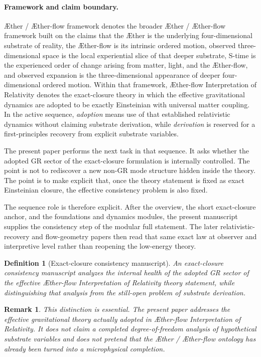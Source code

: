 \documentclass[11pt]{article}
\newcommand{\Aether}{\AE{}ther}
\newcommand{\Aflow}{\AE{}ther-flow}
\newcommand{\TheoryName}{\Aflow{} Interpretation of Relativity}
\newcommand{\TheoryProgram}{\Aether{} / \Aflow{} framework}
\newtheorem{definition}{Definition}
\newtheorem{remark}{Remark}
\begin{document}
\paragraph{Framework and claim boundary.}
\TheoryProgram{} denotes the broader \Aether{} / \Aflow{} framework built on the claims that the \Aether{} is the underlying four-dimensional substrate of reality, the \Aflow{} is its intrinsic ordered motion, observed three-dimensional space is the local experiential slice of that deeper substrate, S-time is the experienced order of change arising from matter, light, and the \Aflow{}, and observed expansion is the three-dimensional appearance of deeper four-dimensional ordered motion. Within that framework, \TheoryName{} denotes the exact-closure theory in which the effective gravitational dynamics are adopted to be exactly Einsteinian with universal matter coupling. In the active sequence, \emph{adoption} means use of that established relativistic dynamics without claiming substrate derivation, while \emph{derivation} is reserved for a first-principles recovery from explicit substrate variables.

The present paper performs the next task in that sequence. It asks whether the adopted GR sector of the exact-closure formulation is internally controlled. The point is not to rediscover a new non-GR mode structure hidden inside the theory. The point is to make explicit that, once the theory statement is fixed as exact Einsteinian closure, the effective consistency problem is also fixed.

The sequence role is therefore explicit. After the overview, the short exact-closure anchor, and the foundations and dynamics modules, the present manuscript supplies the consistency step of the modular full statement. The later relativistic-recovery and flow-geometry papers then read that same exact law at observer and interpretive level rather than reopening the low-energy theory.

\begin{definition}[Exact-closure consistency manuscript]
An exact-closure consistency manuscript analyzes the internal health of the adopted GR sector of the effective \TheoryName{} theory statement, while distinguishing that analysis from the still-open problem of substrate derivation.
\end{definition}

\begin{remark}
This distinction is essential. The present paper addresses the effective gravitational theory actually adopted in \TheoryName{}. It does not claim a completed degree-of-freedom analysis of hypothetical substrate variables and does not pretend that the \Aether{} / \Aflow{} ontology has already been turned into a microphysical completion.
\end{remark}
\end{document}
